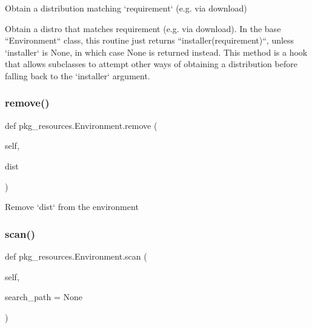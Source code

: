 \begin{DoxyVerb}Obtain a distribution matching `requirement` (e.g. via download)

Obtain a distro that matches requirement (e.g. via download).  In the
base ``Environment`` class, this routine just returns
``installer(requirement)``, unless `installer` is None, in which case
None is returned instead.  This method is a hook that allows subclasses
to attempt other ways of obtaining a distribution before falling back
to the `installer` argument.\end{DoxyVerb}
 \mbox{\label{classpkg__resources_1_1_environment_aa51b1c4f8c8c146f2fc83a833608a0d1}} 
\subsubsection{\texorpdfstring{remove()}{remove()}}
{\footnotesize\ttfamily def pkg\+\_\+resources.\+Environment.\+remove (\begin{DoxyParamCaption}\item[{}]{self,  }\item[{}]{dist }\end{DoxyParamCaption})}

\begin{DoxyVerb}Remove `dist` from the environment\end{DoxyVerb}
 \mbox{\label{classpkg__resources_1_1_environment_a2dd1caa73a329d4c50b0ab9fdec9c1d4}} 
\subsubsection{\texorpdfstring{scan()}{scan()}}
{\footnotesize\ttfamily def pkg\+\_\+resources.\+Environment.\+scan (\begin{DoxyParamCaption}\item[{}]{self,  }\item[{}]{search\+\_\+path = {\ttfamily None} }\end{DoxyParamCaption})}

